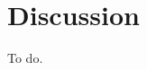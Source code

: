 \documentclass[../main.tex]{subfiles}
\begin{document}
\section{Discussion}

To do.



\end{document}
